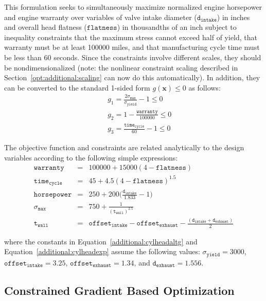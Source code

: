 This formulation seeks to simultaneously maximize normalized engine
horsepower and engine warranty over variables of valve intake diameter
($\mathtt{d_{intake}}$) in inches and overall head flatness
($\mathtt{flatness}$) in thousandths of an inch subject to inequality
constraints that the maximum stress cannot exceed half of yield, that
warranty must be at least 100000 miles, and that manufacturing cycle
time must be less than 60 seconds. Since the constraints involve
different scales, they should be nondimensionalized (note: the
nonlinear constraint scaling described in
Section~\ref{opt:additional:scaling} can now do this
automatically). In addition, they can be converted to the standard
1-sided form $g(\mathbf{x}) \leq 0$ as follows:
\begin{eqnarray}
  & & g_1=\frac{2\sigma_{\mathtt{max}}}{\sigma_{\mathtt{yield}}}-1 \leq 0
  \nonumber\\
  & & g_2=1-\frac{\mathtt{warranty}}{100000} \leq 0
  \label{additional:cylheadaltg}\\
  & & g_3=\frac{\mathtt{time_{cycle}}}{60}-1 \leq 0\nonumber
\end{eqnarray}

The objective function and constraints are related analytically to the
design variables according to the following simple expressions:
\begin{eqnarray}
\mathtt{warranty}     &=& 100000+15000(4-\mathtt{flatness})\nonumber\\
\mathtt{time_{cycle}} &=& 45+4.5(4-\mathtt{flatness})^{1.5}\nonumber\\
\mathtt{horsepower}   &=& 250+200\bigg(\frac{\mathtt{d_{intake}}}{1.833}-1\bigg)
  \label{additional:cylheadexp}\\
\sigma_{\mathtt{max}} &=& 750+\frac{1}{(\mathtt{t_{wall}})^{2.5}}\nonumber\\
\mathtt{t_{wall}}     &=& \mathtt{offset_{intake}-offset_{exhaust}}-
  \frac{(\mathtt{d_{intake}+d_{exhaust}})}{2}\nonumber
\end{eqnarray}

where the constants in Equation~\ref{additional:cylheadaltg} and
Equation~\ref{additional:cylheadexp} assume the following values:
$\sigma_{\mathtt{yield}}=3000$, $\mathtt{offset_{intake}}=3.25$,
$\mathtt{offset_{exhaust}}=1.34$, and $\mathtt{d_{exhaust}}=1.556$.

\subsection{Constrained Gradient Based Optimization}

